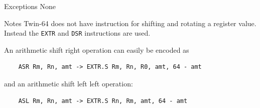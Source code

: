 \begin{iPageDescEntry}{Exceptions}
None
\end{iPageDescEntry}

\begin{iPageDescEntry}{Notes}
Twin-64 does not have instruction for shifting and rotating a register value. Instead the \texttt{EXTR} and \texttt{DSR} instructions are used. 

An arithmetic shift right operation can easily be encoded as

\begin{verbatim}
    ASR Rm, Rn, amt -> EXTR.S Rm, Rn, R0, amt, 64 - amt
\end{verbatim}

and an arithmetic shift left left operation: 

\begin{verbatim}
    ASL Rm, Rn, amt -> EXTR.S Rn, Rm, amt, 64 - amt
\end{verbatim}
\end{iPageDescEntry}
